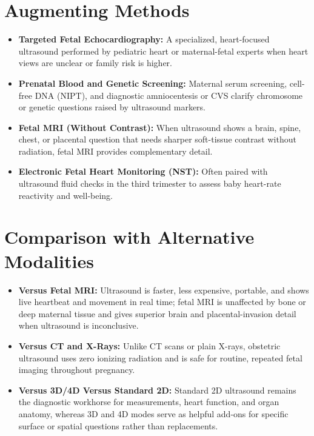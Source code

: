 \section{Augmenting Methods}
\begin{itemize}
\item \textbf{Targeted Fetal Echocardiography:} A specialized, heart-focused ultrasound performed by pediatric heart or maternal-fetal experts when heart views are unclear or family risk is higher.
\item \textbf{Prenatal Blood and Genetic Screening:} Maternal serum screening, cell-free DNA (NIPT), and diagnostic amniocentesis or CVS clarify chromosome or genetic questions raised by ultrasound markers.
\item \textbf{Fetal MRI (Without Contrast):} When ultrasound shows a brain, spine, chest, or placental question that needs sharper soft-tissue contrast without radiation, fetal MRI provides complementary detail.
\item \textbf{Electronic Fetal Heart Monitoring (NST):} Often paired with ultrasound fluid checks in the third trimester to assess baby heart-rate reactivity and well-being.
\end{itemize}

\section{Comparison with Alternative Modalities}
\begin{itemize}
\item \textbf{Versus Fetal MRI:} Ultrasound is faster, less expensive, portable, and shows live heartbeat and movement in real time; fetal MRI is unaffected by bone or deep maternal tissue and gives superior brain and placental-invasion detail when ultrasound is inconclusive.
\item \textbf{Versus CT and X-Rays:} Unlike CT scans or plain X-rays, obstetric ultrasound uses zero ionizing radiation and is safe for routine, repeated fetal imaging throughout pregnancy.
\item \textbf{Versus 3D/4D Versus Standard 2D:} Standard 2D ultrasound remains the diagnostic workhorse for measurements, heart function, and organ anatomy, whereas 3D and 4D modes serve as helpful add-ons for specific surface or spatial questions rather than replacements.
\end{itemize}

